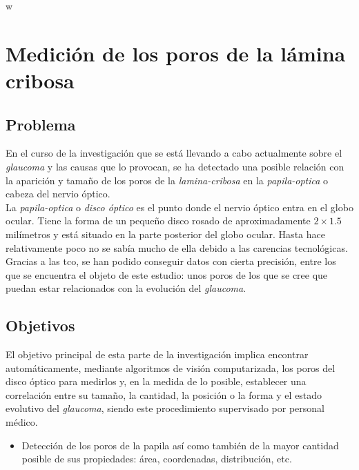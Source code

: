 w\chapter{Medición de los poros de la lámina cribosa}
\section{Problema}
En el curso de la investigación que se está llevando a cabo
actualmente sobre el \emph{\gls{glaucoma}} y las causas que lo
provocan, se ha detectado una posible relación con la aparición y
tamaño de los poros de la \emph{\gls{lamina-cribosa}} en la
\emph{\gls{papila-optica}} o cabeza del nervio óptico. \\
La \emph{\gls{papila-optica}} o \emph{disco óptico} es el punto donde
el nervio óptico entra en el globo ocular. Tiene la forma de un
pequeño disco rosado de aproximadamente $2 \times 1.5$ milímetros y
está situado en la parte posterior del globo ocular. Hasta hace
relativamente poco no se sabía mucho de ella debido a las carencias
tecnológicas. Gracias a las \gls{tco}, se han podido conseguir datos
con cierta precisión, entre los que se encuentra el objeto de este
estudio: unos poros de los que se cree que puedan estar
relacionados con la evolución del \emph{\gls{glaucoma}}.

\section{Objetivos}
El objetivo principal de esta parte de la investigación implica
encontrar automáticamente, mediante algoritmos de visión
computarizada, los poros del disco óptico para medirlos y, en la
medida de lo posible, establecer una correlación entre su tamaño, la
cantidad, la posición o la forma y el estado evolutivo del
\emph{\gls{glaucoma}}, siendo este procedimiento supervisado por
personal médico.
\begin{itemize}
\item Detección de los poros de la papila así como también de la mayor
  cantidad posible de sus propiedades: área, coordenadas,
  distribución, etc.
\end{itemize}


